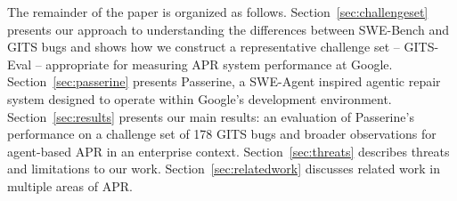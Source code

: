 The remainder of the paper is organized as follows.
Section~\ref{sec:challengeset} presents our approach to understanding the differences between SWE-Bench and GITS bugs and shows how we construct a representative challenge set -- GITS-Eval -- appropriate for measuring APR system performance at Google.
Section~\ref{sec:passerine} presents Passerine, a SWE-Agent inspired agentic repair system designed to operate within Google's development environment.
Section~\ref{sec:results} presents our main results: an evaluation of Passerine's performance on a challenge set of 178 GITS bugs and broader observations
for agent-based APR in an enterprise context.
Section~\ref{sec:threats} describes threats and limitations
to our work.
Section~\ref{sec:relatedwork} discusses related work in 
multiple areas of APR.
